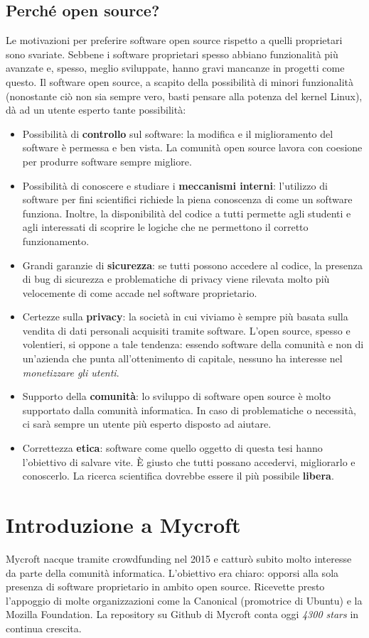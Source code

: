 \subsection{Perché open source?}
Le motivazioni per preferire software open source rispetto a quelli proprietari sono svariate. Sebbene i software proprietari spesso abbiano funzionalità più avanzate e, spesso, meglio sviluppate, hanno gravi mancanze in progetti come questo. Il software open source, a scapito della possibilità di minori funzionalità (nonostante ciò non sia sempre vero, basti pensare alla potenza del kernel Linux), dà ad un utente esperto tante possibilità:
\begin{itemize}
    \item Possibilità di \textbf{controllo} sul software: la modifica e il miglioramento del software è permessa e ben vista. La comunità open source lavora con coesione per produrre software sempre migliore.
    \item Possibilità di conoscere e studiare i \textbf{meccanismi interni}: l'utilizzo di software per fini scientifici richiede la piena conoscenza di come un software funziona. Inoltre, la disponibilità del codice a tutti permette agli studenti e agli interessati di scoprire le logiche che ne permettono il corretto funzionamento.
    \item Grandi garanzie di \textbf{sicurezza}: se tutti possono accedere al codice, la presenza di bug di sicurezza e problematiche di privacy viene rilevata molto più velocemente di come accade nel software proprietario.
    \item Certezze sulla \textbf{privacy}: la società in cui viviamo è sempre più basata sulla vendita di dati personali acquisiti tramite software. L'open source, spesso e volentieri, si oppone a tale tendenza: essendo software della comunità e non di un'azienda che punta all'ottenimento di capitale, nessuno ha interesse nel \textit{monetizzare gli utenti}.
    \item Supporto della \textbf{comunità}: lo sviluppo di software open source è molto supportato dalla comunità informatica. In caso di problematiche o necessità, ci sarà sempre un utente più esperto disposto ad aiutare.
    \item Correttezza \textbf{etica}: software come quello oggetto di questa tesi hanno l'obiettivo di salvare vite. È giusto che tutti possano accedervi, migliorarlo e conoscerlo. La ricerca scientifica dovrebbe essere il più possibile \textbf{libera}.
\end{itemize}
\section{Introduzione a Mycroft}
Mycroft nacque tramite crowdfunding nel 2015 e catturò subito molto interesse da parte della comunità informatica. L'obiettivo era chiaro: opporsi alla sola presenza di software proprietario in ambito open source. Ricevette presto l'appoggio di molte organizzazioni come la Canonical (promotrice di Ubuntu) e la Mozilla Foundation. La repository su Github di Mycroft conta oggi \textit{4300 stars} in continua crescita.
